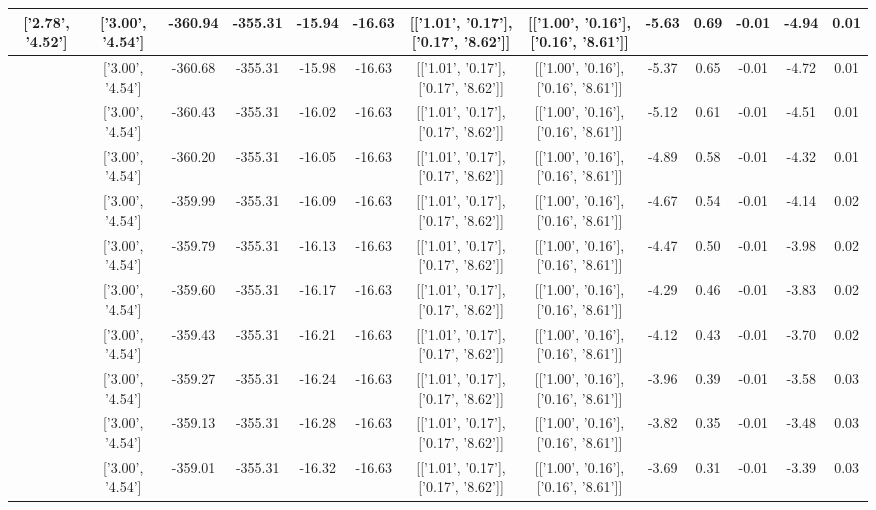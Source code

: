 \begin{table}[htbp]
\begin{adjustbox}{angle=90}
\begin{tabular}{|c|c|c|c|c|c|c|c|c|c|c|c|c|}
 ['2.78', '4.52'] & ['3.00', '4.54'] & -360.94 & -355.31 & -15.94 & -16.63 & [['1.01', '0.17'], ['0.17', '8.62']] & [['1.00', '0.16'], ['0.16', '8.61']] & -5.63 & 0.69 & -0.01 & -4.94 & 0.01\\ \hline
 ['2.79', '4.52'] & ['3.00', '4.54'] & -360.68 & -355.31 & -15.98 & -16.63 & [['1.01', '0.17'], ['0.17', '8.62']] & [['1.00', '0.16'], ['0.16', '8.61']] & -5.37 & 0.65 & -0.01 & -4.72 & 0.01\\ \hline
 ['2.81', '4.53'] & ['3.00', '4.54'] & -360.43 & -355.31 & -16.02 & -16.63 & [['1.01', '0.17'], ['0.17', '8.62']] & [['1.00', '0.16'], ['0.16', '8.61']] & -5.12 & 0.61 & -0.01 & -4.51 & 0.01\\ \hline
 ['2.82', '4.53'] & ['3.00', '4.54'] & -360.20 & -355.31 & -16.05 & -16.63 & [['1.01', '0.17'], ['0.17', '8.62']] & [['1.00', '0.16'], ['0.16', '8.61']] & -4.89 & 0.58 & -0.01 & -4.32 & 0.01\\ \hline
 ['2.83', '4.53'] & ['3.00', '4.54'] & -359.99 & -355.31 & -16.09 & -16.63 & [['1.01', '0.17'], ['0.17', '8.62']] & [['1.00', '0.16'], ['0.16', '8.61']] & -4.67 & 0.54 & -0.01 & -4.14 & 0.02\\ \hline
 ['2.84', '4.53'] & ['3.00', '4.54'] & -359.79 & -355.31 & -16.13 & -16.63 & [['1.01', '0.17'], ['0.17', '8.62']] & [['1.00', '0.16'], ['0.16', '8.61']] & -4.47 & 0.50 & -0.01 & -3.98 & 0.02\\ \hline
 ['2.85', '4.53'] & ['3.00', '4.54'] & -359.60 & -355.31 & -16.17 & -16.63 & [['1.01', '0.17'], ['0.17', '8.62']] & [['1.00', '0.16'], ['0.16', '8.61']] & -4.29 & 0.46 & -0.01 & -3.83 & 0.02\\ \hline
 ['2.87', '4.53'] & ['3.00', '4.54'] & -359.43 & -355.31 & -16.21 & -16.63 & [['1.01', '0.17'], ['0.17', '8.62']] & [['1.00', '0.16'], ['0.16', '8.61']] & -4.12 & 0.43 & -0.01 & -3.70 & 0.02\\ \hline
 ['2.88', '4.53'] & ['3.00', '4.54'] & -359.27 & -355.31 & -16.24 & -16.63 & [['1.01', '0.17'], ['0.17', '8.62']] & [['1.00', '0.16'], ['0.16', '8.61']] & -3.96 & 0.39 & -0.01 & -3.58 & 0.03\\ \hline
 ['2.89', '4.53'] & ['3.00', '4.54'] & -359.13 & -355.31 & -16.28 & -16.63 & [['1.01', '0.17'], ['0.17', '8.62']] & [['1.00', '0.16'], ['0.16', '8.61']] & -3.82 & 0.35 & -0.01 & -3.48 & 0.03\\ \hline
 ['2.90', '4.53'] & ['3.00', '4.54'] & -359.01 & -355.31 & -16.32 & -16.63 & [['1.01', '0.17'], ['0.17', '8.62']] & [['1.00', '0.16'], ['0.16', '8.61']] & -3.69 & 0.31 & -0.01 & -3.39 & 0.03\\ \hline

\end{tabular}
\end{adjustbox}
\end{table}
